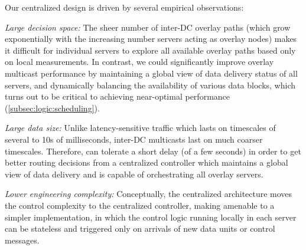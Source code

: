 Our centralized design is driven by several empirical observations:
\begin{packedenumerate}

\item {\em Large decision space:}
The sheer number of inter-DC overlay paths (which grow exponentially
with the increasing number servers acting as overlay nodes) makes it difficult for
individual servers to explore all available overlay paths based only
on local measurements. In contrast, we could significantly improve
overlay multicast performance by maintaining a global view of data
delivery status of all servers, and dynamically balancing the
availability of various data blocks, which turns out to be critical
to achieving near-optimal performance
(\Section\ref{subsec:logic:scheduling}).

\item {\em Large data size:}
Unlike latency-sensitive traffic which lasts
on timescales of several to 10s of milliseconds, inter-DC multicasts
last on much coarser timescales.
Therefore, \name can tolerate a short delay (of a few seconds) in order
to get better routing decisions from a centralized controller which
maintains a global view of data delivery and is capable of orchestrating
all overlay servers.


\item {\em Lower engineering complexity:}
Conceptually, the centralized architecture moves the control
complexity to the centralized controller, making \name amenable to a
simpler implementation, in which the control logic running locally in
each server can be stateless and triggered only on arrivals of new
data units or control messages.

\end{packedenumerate}

